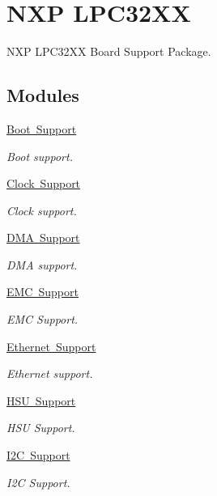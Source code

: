 \hypertarget{group__RTEMSBSPsARMLPC32XX}{}\section{N\+XP L\+P\+C32\+XX}
\label{group__RTEMSBSPsARMLPC32XX}


N\+XP L\+P\+C32\+XX Board Support Package.  


\subsection*{Modules}
\begin{DoxyCompactItemize}
\item 
\mbox{\hyperlink{group__lpc32xx__boot}{Boot Support}}
\begin{DoxyCompactList}\small\item\em Boot support. \end{DoxyCompactList}\item 
\mbox{\hyperlink{group__lpc__clock}{Clock Support}}
\begin{DoxyCompactList}\small\item\em Clock support. \end{DoxyCompactList}\item 
\mbox{\hyperlink{group__lpc__dma}{D\+M\+A Support}}
\begin{DoxyCompactList}\small\item\em D\+MA support. \end{DoxyCompactList}\item 
\mbox{\hyperlink{group__lpc__emc}{E\+M\+C Support}}
\begin{DoxyCompactList}\small\item\em E\+MC Support. \end{DoxyCompactList}\item 
\mbox{\hyperlink{group__lpc__eth}{Ethernet Support}}
\begin{DoxyCompactList}\small\item\em Ethernet support. \end{DoxyCompactList}\item 
\mbox{\hyperlink{group__lpc32xx__hsu}{H\+S\+U Support}}
\begin{DoxyCompactList}\small\item\em H\+SU Support. \end{DoxyCompactList}\item 
\mbox{\hyperlink{group__lpc32xx__i2c}{I2\+C Support}}
\begin{DoxyCompactList}\small\item\em I2C Support. \end{DoxyCompactList}\item 

\end{DoxyCompactItemize}
